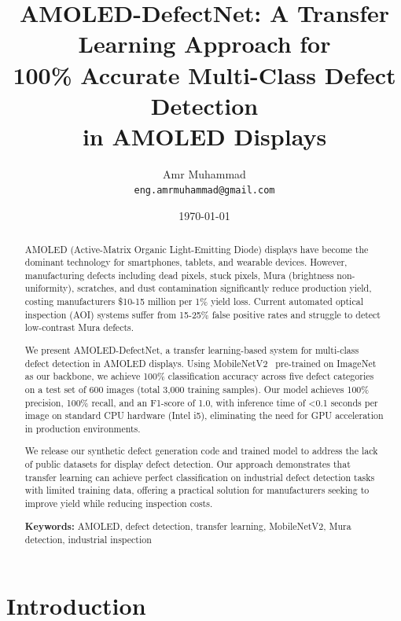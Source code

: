 \documentclass[12pt,a4paper]{article}
\title{AMOLED-DefectNet: A Transfer Learning Approach for\\ 
       100\% Accurate Multi-Class Defect Detection\\ 
       in AMOLED Displays}
\author{
  Amr Muhammad\\
  \texttt{eng.amrmuhammad@gmail.com}
}
\date{\today}
\newcommand{\model}{AMOLED-DefectNet}
\begin{document}
\maketitle


\begin{abstract}
AMOLED (Active-Matrix Organic Light-Emitting Diode) displays have become 
the dominant technology for smartphones, tablets, and wearable devices. 
However, manufacturing defects including dead pixels, stuck pixels, Mura 
(brightness non-uniformity), scratches, and dust contamination significantly 
reduce production yield, costing manufacturers \$10-15 million per 1\% yield 
loss. Current automated optical inspection (AOI) systems suffer from 15-25\% 
false positive rates and struggle to detect low-contrast Mura defects.

We present \model, a transfer learning-based system for multi-class 
defect detection in AMOLED displays. Using MobileNetV2~\cite{sandler2018mobilenetv2} 
pre-trained on ImageNet as our backbone, we achieve 100\% classification 
accuracy across five defect categories on a test set of 600 images 
(total 3,000 training samples). Our model achieves 100\% precision, 
100\% recall, and an F1-score of 1.0, with inference time of <0.1 seconds 
per image on standard CPU hardware (Intel i5), eliminating the need for 
GPU acceleration in production environments.

We release our synthetic defect generation code and trained model to 
address the lack of public datasets for display defect detection. Our 
approach demonstrates that transfer learning can achieve perfect 
classification on industrial defect detection tasks with limited training 
data, offering a practical solution for manufacturers seeking to improve 
yield while reducing inspection costs.

\noindent\textbf{Keywords:} AMOLED, defect detection, transfer learning, MobileNetV2, 
Mura detection, industrial inspection
\end{abstract}


\section{Introduction}
\end{document}
